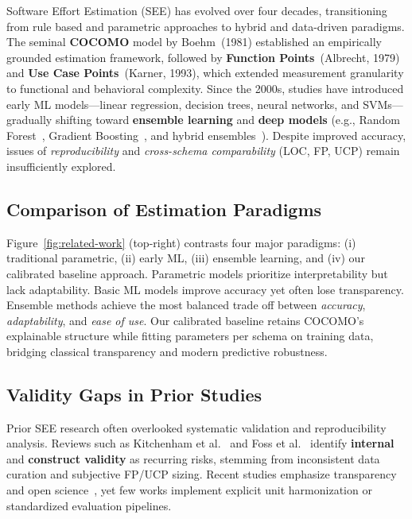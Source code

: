 \documentclass[11pt,a4paper]{article}
\begin{document}
Software Effort Estimation (SEE) has evolved over four decades, 
transitioning from rule based and parametric approaches 
to hybrid and data-driven paradigms.  
The seminal \textbf{COCOMO} model by Boehm~(1981) established 
an empirically grounded estimation framework, 
followed by \textbf{Function Points}~(Albrecht, 1979) 
and \textbf{Use Case Points}~(Karner, 1993), 
which extended measurement granularity to functional and behavioral complexity.  
Since the 2000s, studies have introduced early ML models—linear regression, 
decision trees, neural networks, and SVMs—gradually shifting toward 
\textbf{ensemble learning} and \textbf{deep models} 
(e.g., Random Forest~\cite{breiman2001random}, 
Gradient Boosting~\cite{friedman2001greedy}, 
and hybrid ensembles~\cite{pandey2023comprehensive,alqadi2021deep}).  
Despite improved accuracy, issues of \textit{reproducibility} 
and \textit{cross-schema comparability} (LOC, FP, UCP) 
remain insufficiently explored.

\subsection{Comparison of Estimation Paradigms}

Figure~\ref{fig:related-work} (top-right) contrasts 
four major paradigms: (i) traditional parametric, (ii) early ML, 
(iii) ensemble learning, and (iv) our calibrated baseline approach.  
Parametric models prioritize interpretability but lack adaptability.  
Basic ML models improve accuracy yet often lose transparency.  
Ensemble methods achieve the most balanced trade off between 
\textit{accuracy}, \textit{adaptability}, and \textit{ease of use}.  
Our calibrated baseline retains COCOMO’s explainable structure 
while fitting parameters per schema on training data, 
bridging classical transparency and modern predictive robustness.

\subsection{Validity Gaps in Prior Studies}

Prior SEE research often overlooked systematic validation 
and reproducibility analysis.  
Reviews such as Kitchenham et al.~\cite{kitchenham2001evaluating} 
and Foss et al.~\cite{foss2003bias} identify 
\textbf{internal} and \textbf{construct validity} as recurring risks, 
stemming from inconsistent data curation and subjective FP/UCP sizing.  
Recent studies emphasize transparency and open science~\cite{nair2020open,cruz2019open}, 
yet few works implement explicit unit harmonization 
or standardized evaluation pipelines.
\end{document}
